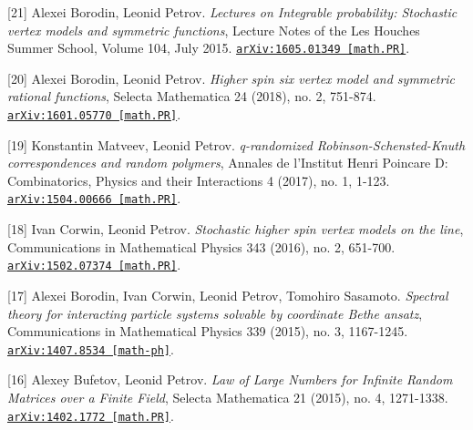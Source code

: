 \begin{etaremune}
\item[{[21]}] 
Alexei Borodin, Leonid Petrov.
\emph{Lectures on Integrable probability: Stochastic vertex models and symmetric functions}, Lecture Notes of the Les Houches Summer School, Volume 104, July 2015. 
\href{https://arxiv.org/abs/1605.01349}{\texttt{arXiv:1605.01349 [math.PR]}}.



\item[{[20]}] 
Alexei Borodin, Leonid Petrov.
\emph{Higher spin six vertex model and symmetric rational functions}, Selecta Mathematica 24 (2018), no. 2, 751-874. 
\href{https://arxiv.org/abs/1601.05770}{\texttt{arXiv:1601.05770 [math.PR]}}.









\item[{[19]}] 
Konstantin Matveev, Leonid Petrov.
\emph{q-randomized Robinson-Schensted-Knuth correspondences and random polymers}, Annales de l'Institut Henri Poincare D: Combinatorics, Physics and their Interactions 4 (2017), no. 1, 1-123. 
\href{https://arxiv.org/abs/1504.00666}{\texttt{arXiv:1504.00666 [math.PR]}}.





\item[{[18]}] 
Ivan Corwin, Leonid Petrov.
\emph{Stochastic higher spin vertex models on the line}, Communications in Mathematical Physics 343 (2016), no. 2, 651-700. 
\href{https://arxiv.org/abs/1502.07374}{\texttt{arXiv:1502.07374 [math.PR]}}.













\item[{[17]}] 
Alexei Borodin, Ivan Corwin, Leonid Petrov, Tomohiro Sasamoto.
\emph{Spectral theory for interacting particle systems solvable by coordinate Bethe ansatz}, Communications in Mathematical Physics 339 (2015), no. 3, 1167-1245. 
\href{https://arxiv.org/abs/1407.8534}{\texttt{arXiv:1407.8534 [math-ph]}}.





\item[{[16]}] 
Alexey Bufetov, Leonid Petrov.
\emph{Law of Large Numbers for Infinite Random Matrices over a Finite Field}, Selecta Mathematica 21 (2015), no. 4, 1271-1338. 
\href{https://arxiv.org/abs/1402.1772}{\texttt{arXiv:1402.1772 [math.PR]}}.














\end{etaremune}

